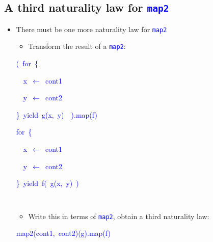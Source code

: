 \subsection{A third naturality law for \texttt{\textcolor{blue}{\footnotesize{}map2}} }
\begin{itemize}
\item \vspace{-0.1cm}There must be one more naturality law for \texttt{\textcolor{blue}{\footnotesize{}map2}} 
\begin{itemize}
\item Transform the result of a \texttt{\textcolor{blue}{\footnotesize{}map2}}:\texttt{\textcolor{blue}{\footnotesize{}\smallskip{}
}}{\footnotesize\par}
\end{itemize}
\texttt{\textcolor{blue}{\footnotesize{}}}%
\begin{minipage}[c][1\totalheight][t]{0.49\columnwidth}%
\begin{lyxcode}
\textcolor{blue}{\footnotesize{}(~for~\{}{\footnotesize\par}

\textcolor{blue}{\footnotesize{}~~x~$\leftarrow$~cont1}{\footnotesize\par}

\textcolor{blue}{\footnotesize{}~~y~$\leftarrow$~cont2}{\footnotesize\par}

\textcolor{blue}{\footnotesize{}\}~yield~g(x,~y)~~).map(f)}{\footnotesize\par}
\end{lyxcode}
%
\end{minipage}\texttt{\textcolor{blue}{\footnotesize{}\hfill{}}}%
\begin{minipage}[c][1\totalheight][t]{0.49\columnwidth}%
\begin{lyxcode}
\textcolor{blue}{\footnotesize{}for~\{}{\footnotesize\par}

\textcolor{blue}{\footnotesize{}~~x~$\leftarrow$~cont1}{\footnotesize\par}

\textcolor{blue}{\footnotesize{}~~y~$\leftarrow$~cont2}{\footnotesize\par}

\textcolor{blue}{\footnotesize{}\}~yield~f(~g(x,~y)~)}{\footnotesize\par}
\end{lyxcode}
%
\end{minipage}\texttt{\textcolor{blue}{\footnotesize{}\hfill{}\medskip{}
}}{\footnotesize\par}
\begin{itemize}
\item Write this in terms of \texttt{\textcolor{blue}{\footnotesize{}map2}},
obtain a third naturality law:
\end{itemize}
\begin{lyxcode}
\textcolor{blue}{\footnotesize{}map2(cont1,~cont2)(g).map(f)}{\footnotesize\par}


\end{lyxcode}
\end{itemize}
